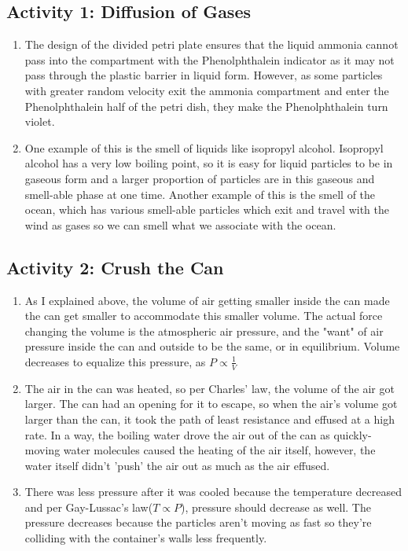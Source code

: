 \documentclass{article}
\begin{document}
\subsection{Activity 1: Diffusion of Gases}
\begin{enumerate}
        \item The design of the divided petri plate ensures that the liquid ammonia cannot pass into the compartment with the Phenolphthalein indicator as it may not pass through the plastic barrier in liquid form.  However, as some particles with greater random velocity exit the ammonia compartment and enter the Phenolphthalein half of the petri dish, they make the Phenolphthalein turn violet.
        \item One example of this is the smell of liquids like isopropyl alcohol.  Isopropyl alcohol has a very low boiling point, so it is easy for liquid particles to be in gaseous form and a larger proportion of particles are in this gaseous and smell-able phase at one time.  Another example of this is the smell of the ocean, which has various smell-able particles which exit and travel with the wind as gases so we can smell what we associate with the ocean.
    \end{enumerate}
\subsection{Activity 2: Crush the Can}
    \begin{enumerate}
        \item As I explained above, the volume of air getting smaller inside the can made the can get smaller to accommodate this smaller volume. The actual force changing the volume is the atmospheric air pressure, and the "want" of air pressure inside the can and outside to be the same, or in equilibrium. Volume decreases to equalize this pressure, as $P\propto \frac{1}{V}$
        \item The air in the can was heated, so per Charles' law, the volume of the air got larger.  The can had an opening for it to escape, so when the air's volume got larger than the can, it took the path of least resistance and effused at a high rate. In a way, the boiling water drove the air out of the can as quickly-moving water molecules caused the heating of the air itself, however, the water itself didn't 'push' the air out as much as the air effused.
        \item There was less pressure after it was cooled because the temperature decreased and per Gay-Lussac's law($T\propto P$), pressure should decrease as well. The pressure decreases because the particles aren't moving as fast so they're colliding with the container's walls less frequently. 
    \end{enumerate}
\end{document}
